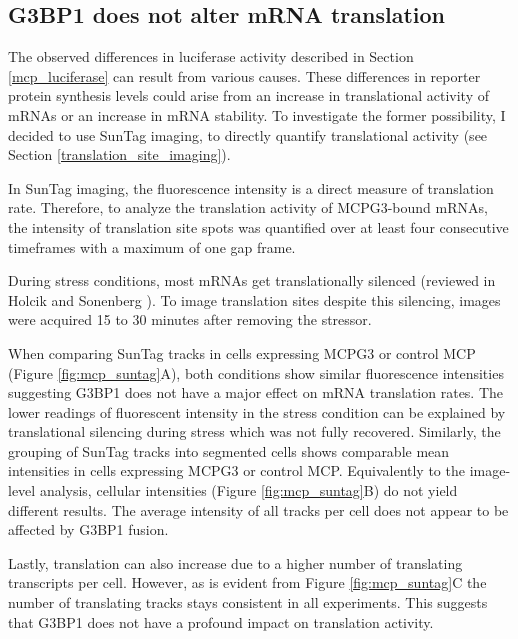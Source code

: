\subsection{G3BP1 does not alter mRNA translation}\label{mcp_suntag}

The observed differences in luciferase activity described in Section \ref{mcp_luciferase} can result from various causes.
These differences in reporter protein synthesis levels could arise from an increase in translational activity of mRNAs or an increase in mRNA stability.
To investigate the former possibility, I decided to use SunTag imaging, to directly quantify translational activity (see Section \ref{translation_site_imaging}).

In SunTag imaging, the fluorescence intensity is a direct measure of translation rate.
Therefore, to analyze the translation activity of MCPG3-bound mRNAs, the intensity of translation site spots was quantified over at least four consecutive timeframes with a maximum of one gap frame.

During stress conditions, most mRNAs get translationally silenced (reviewed in Holcik and Sonenberg \cite{holcik_translational_2005}).
To image translation sites despite this silencing, images were acquired 15 to 30 minutes after removing the stressor.

When comparing SunTag tracks in cells expressing MCPG3 or control MCP (Figure \ref{fig:mcp_suntag}A), both conditions show similar fluorescence intensities suggesting G3BP1 does not have a major effect on mRNA translation rates.
The lower readings of fluorescent intensity in the stress condition can be explained by translational silencing during stress which was not fully recovered.
Similarly, the grouping of SunTag tracks into segmented cells shows comparable mean intensities in cells expressing MCPG3 or control MCP.
Equivalently to the image-level analysis, cellular intensities (Figure \ref{fig:mcp_suntag}B) do not yield different results.
The average intensity of all tracks per cell does not appear to be affected by G3BP1 fusion.

Lastly, translation can also increase due to a higher number of translating transcripts per cell.
However, as is evident from Figure \ref{fig:mcp_suntag}C the number of translating tracks stays consistent in all experiments.
This suggests that G3BP1 does not have a profound impact on translation activity.

